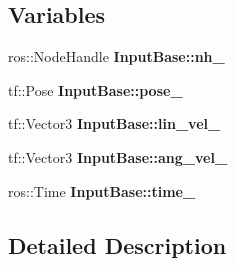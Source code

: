 \subsection*{Variables}
\begin{DoxyCompactItemize}
\item 
\mbox{\label{group__Input_ga0a51906c129d50a4cb72c9490366f908}} 
ros\+::\+Node\+Handle {\bfseries Input\+Base\+::nh\+\_\+}
\item 
\mbox{\label{group__Input_ga6642dbf660c3920565cbe03362cef669}} 
tf\+::\+Pose {\bfseries Input\+Base\+::pose\+\_\+}
\item 
\mbox{\label{group__Input_ga4cdb2c68eb1e92fd506abc3b67e07253}} 
tf\+::\+Vector3 {\bfseries Input\+Base\+::lin\+\_\+vel\+\_\+}
\item 
\mbox{\label{group__Input_gac7b926b7f75cae99eeaa2a59177a2fd6}} 
tf\+::\+Vector3 {\bfseries Input\+Base\+::ang\+\_\+vel\+\_\+}
\item 
\mbox{\label{group__Input_gad07135f935112ff25b7e579dcdc7ff72}} 
ros\+::\+Time {\bfseries Input\+Base\+::time\+\_\+}
\end{DoxyCompactItemize}


\subsection{Detailed Description}
